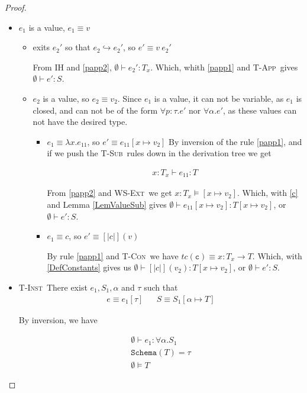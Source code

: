 \documentclass[10pt,a4paper]{article}
\newcommand\tc[1]{\ensuremath{tc\left(\texttt{#1}\right)}}
\newcommand\tfun[3]{\ensuremath{#1 : #2 \rightarrow #3}}
\newcommand\ttabs[2]{\ensuremath{\forall #1 . #2}}
\newcommand\etabs[2]{\ensuremath{\forall #1 . #2}}
\newcommand\epabs[3]{\ensuremath{\forall #1 : #2 . #3}}
\newcommand\efun[2]{\ensuremath{\lambda #1 . #2}}
\newcommand\eapp[2]{\ensuremath{{#1} \ {#2}}}
\newcommand\etapp[2]{\ensuremath{{#1} \left[ {#2}\right]}}
\newcommand\tapp{\rulename{T-App}}
\newcommand\tsub{\rulename{T-Sub}}
\newcommand\tcon{\rulename{T-Con}}
\newcommand\tinst{\rulename{T-Inst}}
\newcommand\wsExt{\rulename{WS-Ext}}
\newcommand\isWellFormed[2]{\ensuremath{{#1}\models {#2}}}
\newcommand\isSub[3]{\ensuremath{{#1}\vdash {#2}<:{#3}}}
\newcommand\hastype[3]{\ensuremath{{#1}\vdash {#2}:{#3}}}
\newcommand\eval[2]{\ensuremath{{#1}\hookrightarrow {#2}}}
\newcommand\hastypeEmp[2]{\hastype{\emptyset}{#1}{#2}}
\newcommand\isSubEmp[2]{\isSub{\emptyset}{#1}{#2}}
\newcommand\rulename[1]{\textsc{#1}}
\newcommand\sch[1]{\ensuremath{\texttt{Schema}\left(#1\right)}}
\newcommand\sub[2]{\ensuremath{\left[ #1 \mapsto #2 \right]}}
\begin{document}
\begin{proof}
\begin{itemize}
\begin{itemize}
From Lemma \ref{LemEvalSub} we get 
\begin{align*}
\isSubEmp{T\sub{x}{e_1'}}{T\sub{x}{e_1}}
\end{align*}
Which with \ref{prese1} and \tsub\ gives
$$\hastypeEmp{e'}{S}$$.
	\item $e_1$ is a value, $e_1 \equiv v$
	\begin{itemize}
		\item exits $e_2'$ so that \eval{e_2}{e_2'}, so $e' \equiv \eapp{v}{e_2'}$
		
		From IH and \ref{papp2}, \hastypeEmp{e_2'}{T_x}. 
		Which, whith \ref{papp1} and \tapp\ gives \hastypeEmp{e'}{S}.
		\item $e_2$ is a value, so $e_2 \equiv v_2$.
		Since $e_1$ is a value, it can not be variable, as $e_1$ is closed,
		and can not be of the form $\epabs{p}{\tau}{e'}$ nor $\etabs{\alpha}{e'}$,
		as these values can not have the desired type. 
		\begin{itemize}
			\item $e_1 \equiv \efun{x}{e_{11}}$, so $e' \equiv e_{11}\sub{x}{v_2}$
			By inversion of the rule \ref{papp1}, and if we push the \tsub \ rules down in the derivation tree we get
			 
			\begin{align}
			\hastype{x:T_x}{e_{11}}{T} \label{c}
			\end{align}
			
			From  \ref{papp2} and \wsExt \ we get \isWellFormed{x:T_x}{\sub{x}{v_2}}.
			Which, with \ref{c} and Lemma \ref{LemValueSub} gives 
			\hastypeEmp{e_{11}\sub{x}{v_2}}{T\sub{x}{v_2}}, or  
			\hastypeEmp{e'}{S}.  
			\item $e_1 \equiv c$, so $e' \equiv [|c|](v)$
			
			By rule \ref{papp1} and \tcon \ we have 
			$\tc{c} \equiv \tfun{x}{T_x}{T}$.
			Which, with \ref{DefConstants} gives us 
			\hastypeEmp{[|c|](v_2)}{T\sub{x}{v_2}}, or 
			\hastypeEmp{e'}{S}. 
		\end{itemize}
	\end{itemize}

\item \tinst\ There exist $e_1, S_1, \alpha$ and $\tau$ such that
\begin{align*}
e \equiv \etapp{e_1}{\tau} && S \equiv S_1\sub{\alpha}{T}
\end{align*}

By inversion, we have

\begin{align}
\hastypeEmp{e_1}{\ttabs{\alpha}{S_1}} \label{d1}\\
\sch{T} = \tau \label{e1}\\
\isWellFormed{\emptyset}{T} \label{f}
\end{align} 


\end{itemize}
\end{itemize}
\end{proof}
\end{document}

